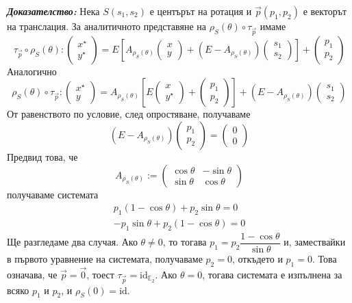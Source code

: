 \documentclass[12pt]{article}
\begin{document}
\textbf{\textit{Доказателство:}} Нека $S(s_1,s_2)$ е центърът на ротация и $\vec{p}(p_1,p_2)$ е векторът на транслация. За аналитичното представяне на $\rho_S(\theta)\circ\tau_{\vec{p}}$ имаме $$\tau_{\vec{p}}\circ\rho_S(\theta):\begin{pmatrix} x^\star \\ y^{\star}\end{pmatrix}=E\left[A_{\rho_S(\theta)}\begin{pmatrix} x \\ y\end{pmatrix}+(E-A_{\rho_S(\theta)})\begin{pmatrix} s_1 \\ s_2\end{pmatrix}\right]+\begin{pmatrix} p_1 \\ p_2\end{pmatrix}$$ Аналогично $$\rho_S(\theta)\circ\tau_{\vec{p}}:\begin{pmatrix} x^\star \\ y\end{pmatrix}=A_{\rho_S(\theta)}\left[E\begin{pmatrix} x \\ y^{\star}\end{pmatrix}+\begin{pmatrix} p_1 \\ p_2\end{pmatrix}\right]+(E-A_{\rho_S(\theta)})\begin{pmatrix}s_1 \\ s_2\end{pmatrix}$$ От равенството по условие, след опростяване, получаваме $$(E-A_{\rho_S(\theta)})\begin{pmatrix} p_1 \\ p_2\end{pmatrix}=\begin{pmatrix} 0 \\ 0\end{pmatrix}$$ Предвид това, че $$A_{\rho_S(\theta)}:=\begin{pmatrix}\cos\theta & -\sin\theta \\ \sin\theta & \cos\theta\end{pmatrix}$$ получаваме системата $$\begin{array}{|l} p_1(1-\cos\theta)+p_2\sin\theta=0 \\-p_1\sin\theta+p_2(1-\cos\theta)=0\end{array}$$ Ще разгледаме два случая. Ако $\theta\neq 0$, то тогава $p_1=p_2\dfrac{1-\cos\theta}{\sin\theta}$ и, замествайки в първото уравнение на системата, получаваме $p_2=0$, откъдето и $p_1=0$. Това означава, че $\vec{p}=\vec{0}$, тоест $\tau_{\vec{p}}=\mathrm{id}_{\mathbb E_2}$. Ако $\theta = 0$, тогава системата е изпълнена за всяко $p_1$ и $p_2$, и $\rho_S(0)=\mathrm{id}$.
\end{document}
